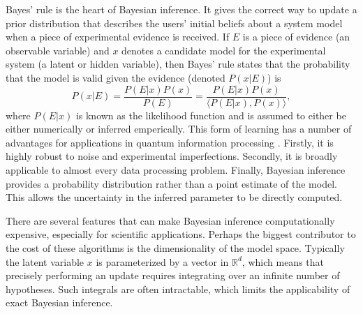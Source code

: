 \documentclass[aps,amsmath,onecolumn,amssymb,notitlepage]{revtex4-1}
\begin{document}
Bayes' rule is the heart of Bayesian inference.  It gives the correct way to update a prior distribution that describes the users' initial beliefs about a system model when a piece of experimental evidence is received.  If $E$ is a piece of evidence (an observable variable) and $x$ denotes a candidate model for the experimental system (a latent or hidden variable), then Bayes' rule states that the probability that the model is valid given the evidence (denoted $P(x|E)$) is 
\begin{equation}
P(x|E)= \frac{P(E|x) P(x)}{P(E)}= \frac{P(E|x) P(x)}{\langle P(E|x), P(x) \rangle},\label{eq:Bayes}
\end{equation}
where $P(E|x)$ is known as the likelihood function and is assumed to either be either numerically or inferred emperically.
This form of learning has a number of advantages for applications in quantum information processing \cite{granade_robust_2012,ferrie_likelihood-free_2014}.  Firstly, it is highly robust to noise and experimental imperfections.  Secondly, it is broadly applicable to almost every data processing problem.  Finally, Bayesian inference provides a probability distribution rather than a point estimate of the model. This allows the uncertainty in the inferred parameter to be directly computed.



There are several features that can make Bayesian inference computationally expensive, especially for scientific applications.  Perhaps the biggest contributor to the cost of these algorithms is the dimensionality of the model space.  Typically the latent variable $x$ is parameterized by a vector in $\mathbb{R}^d$, which means that precisely performing an update requires integrating over an infinite number of hypotheses.  Such integrals are often intractable, which limits the applicability of exact Bayesian inference.  %
\end{document}
